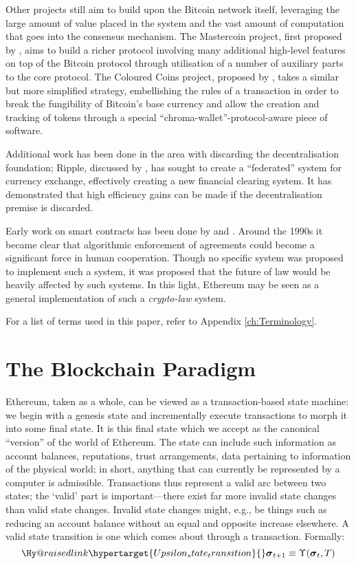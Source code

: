 \documentclass[9pt,oneside]{amsart}
\makeatletter
\newcommand{\linkdest}[1]{\Hy@raisedlink{\hypertarget{#1}{}}}
\newcommand*\eg{e.g.\@\xspace}
\makeatother
\begin{document}
\begin{multicols}{2}
Other projects still aim to build upon the Bitcoin network itself, leveraging the large amount of value placed in the system and the vast amount of computation that goes into the consensus mechanism. The Mastercoin project, first proposed by \cite{mastercoin2013willett}, aims to build a richer protocol involving many additional high-level features on top of the Bitcoin protocol through utilisation of a number of auxiliary parts to the core protocol. The Coloured Coins project, proposed by \cite{colouredcoins2012rosenfeld}, takes a similar but more simplified strategy, embellishing the rules of a transaction in order to break the fungibility of Bitcoin's base currency and allow the creation and tracking of tokens through a special ``chroma-wallet''-protocol-aware piece of software.

Additional work has been done in the area with discarding the decentralisation foundation; Ripple, discussed by \cite{boutellier2014pirates}, has sought to create a ``federated'' system for currency exchange, effectively creating a new financial clearing system. It has demonstrated that high efficiency gains can be made if the decentralisation premise is discarded.

Early work on smart contracts has been done by \cite{szabo1997formalizing} and \cite{miller1997future}. Around the 1990s it became clear that algorithmic enforcement of agreements could become a significant force in human cooperation. Though no specific system was proposed to implement such a system, it was proposed that the future of law would be heavily affected by such systems. In this light, Ethereum may be seen as a general implementation of such a \textit{crypto-law} system.

For a list of terms used in this paper, refer to Appendix \ref{ch:Terminology}.

\section{The Blockchain Paradigm} \label{ch:overview}

Ethereum, taken as a whole, can be viewed as a transaction-based state machine: we begin with a genesis state and incrementally execute transactions to morph it into some final state. It is this final state which we accept as the canonical ``version'' of the world of Ethereum. The state can include such information as account balances, reputations, trust arrangements, data pertaining to information of the physical world; in short, anything that can currently be represented by a computer is admissible. Transactions thus represent a valid arc between two states; the `valid' part is important---there exist far more invalid state changes than valid state changes. Invalid state changes might, \eg, be things such as reducing an account balance without an equal and opposite increase elsewhere. A valid state transition is one which comes about through a transaction. Formally: 
\begin{equation}
\linkdest{Upsilon_state_transition}\boldsymbol{\sigma}_{t+1} \equiv \Upsilon(\boldsymbol{\sigma}_{t}, T)
\end{equation}


\end{multicols}
\end{document}
